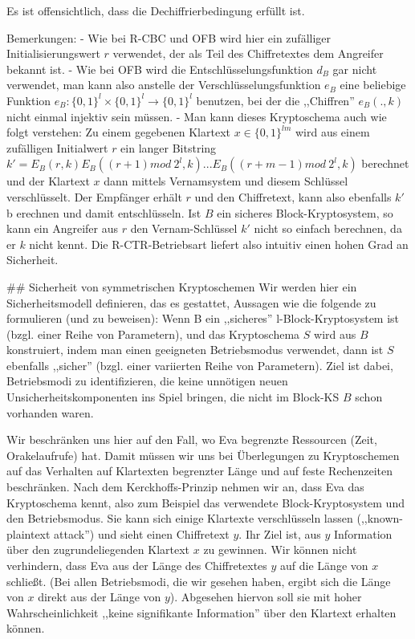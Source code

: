 \documentclass[a4paper]{article}
\begin{document}
\begin{multicols}{3}
Es ist offensichtlich, dass die Dechiffrierbedingung erfüllt ist.

Bemerkungen:
- Wie bei R-CBC und OFB wird hier ein zufälliger Initialisierungswert $r$ verwendet, der als Teil des Chiffretextes dem Angreifer bekannt ist.
- Wie bei OFB wird die Entschlüsselungsfunktion $d_B$ gar nicht verwendet, man kann also anstelle der Verschlüsselungsfunktion $e_B$ eine beliebige Funktion $e_B:\{0,1\}^l\times\{0,1\}^l\rightarrow\{0,1\}^l$ benutzen, bei der die ,,Chiffren'' $e_B(.,k)$ nicht einmal injektiv sein müssen.
- Man kann dieses Kryptoschema auch wie folgt verstehen: Zu einem gegebenen Klartext $x\in\{0,1\}^{lm}$ wird aus einem zufälligen Initialwert $r$ ein langer Bitstring $k′=E_B(r,k) E_B((r+1) mod\ 2^l,k)... E_B((r+m-1) mod\ 2^l,k)$ berechnet und der Klartext $x$ dann mittels Vernamsystem und diesem Schlüssel verschlüsselt. Der Empfänger erhält $r$ und den Chiffretext, kann also ebenfalls $k′$ b erechnen und damit entschlüsseln. Ist $B$ ein sicheres Block-Kryptosystem, so kann ein Angreifer aus $r$ den Vernam-Schlüssel $k′$ nicht so einfach berechnen, da er $k$ nicht kennt. Die R-CTR-Betriebsart liefert also intuitiv einen hohen Grad an Sicherheit.

## Sicherheit von symmetrischen Kryptoschemen
Wir werden hier ein Sicherheitsmodell definieren, das es gestattet, Aussagen wie die folgende zu formulieren (und zu beweisen): Wenn B ein ,,sicheres'' l-Block-Kryptosystem ist (bzgl. einer Reihe von Parametern), und das Kryptoschema $S$ wird aus $B$ konstruiert, indem man einen geeigneten Betriebsmodus verwendet, dann ist $S$ ebenfalls ,,sicher'' (bzgl. einer variierten Reihe von Parametern). Ziel ist dabei, Betriebsmodi zu identifizieren, die keine unnötigen neuen Unsicherheitskomponenten ins Spiel bringen, die nicht im Block-KS
$B$ schon vorhanden waren.

Wir beschränken uns hier auf den Fall, wo Eva begrenzte Ressourcen (Zeit, Orakelaufrufe) hat. Damit müssen wir uns bei Überlegungen zu Kryptoschemen auf das Verhalten auf Klartexten begrenzter Länge und auf feste Rechenzeiten beschränken. Nach dem Kerckhoffs-Prinzip nehmen wir an, dass Eva das Kryptoschema kennt, also zum Beispiel das verwendete Block-Kryptosystem und den Betriebsmodus. Sie kann sich einige Klartexte verschlüsseln lassen (,,known-plaintext attack'') und sieht einen Chiffretext $y$. Ihr Ziel ist, aus $y$ Information über den zugrundeliegenden Klartext $x$ zu gewinnen. Wir können nicht verhindern, dass Eva aus der Länge des Chiffretextes $y$ auf die Länge von $x$ schließt. (Bei allen Betriebsmodi, die wir gesehen haben, ergibt sich die Länge von $x$ direkt aus der Länge von $y$). Abgesehen hiervon soll sie mit hoher Wahrscheinlichkeit ,,keine signifikante Information'' über den Klartext erhalten können.


\end{multicols}
\end{document}
